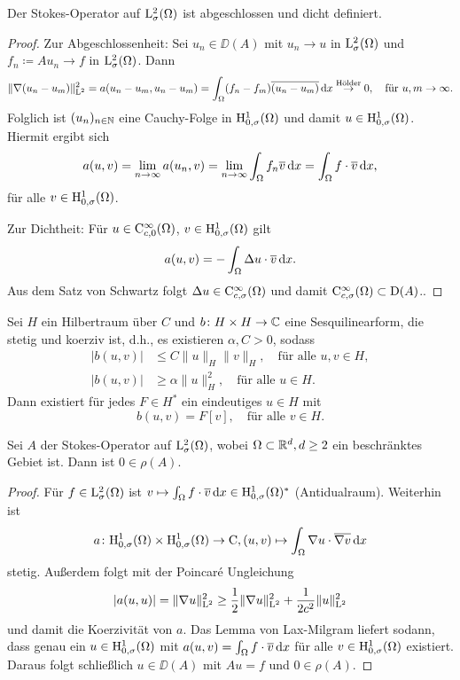 \begin{prop}
  Der Stokes-Operator auf $\mathrm{L}_\sigma^2(\Omega)$ ist abgeschlossen und dicht definiert.
\end{prop}

\begin{proof}
  Zur Abgeschlossenheit: Sei $u_n \in \DD(A)$ mit $u_n \to u$ in $\mathrm{L}^2_\sigma(\Omega)$ und $f_n \coloneqq A u_n \to f$ in $\mathrm{L}^2_\sigma(\Omega)$.
  Dann
  $$
  \|\nabla(u_n - u_m)\|_{\mathrm{L}^2}^2 
  = a(u_n - u_m, u_n - u_m)
  = \int_\Omega (f_n - f_m) \overline{(u_n - u_m)} \, {\operatorname{d}\!{x}}
  \overset{\text{Hölder}}{\to} 0, \quad\text{für } u,m \to \infty.
  $$
  Folglich ist $(u_n)_{n \in \mathbb{N}}$ eine Cauchy-Folge in $\mathrm{H}_{0,\sigma}^1(\Omega)$ und damit $u \in \mathrm{H}_{0,\sigma}^1(\Omega)$.
  Hiermit ergibt sich
  $$
  a(u,v) 
  = \lim_{n \to \infty} a(u_n,v)
  = \lim_{n \to \infty} \int_\Omega f_n \overline{v} \, {\operatorname{d}\!{x}}
  = \int_\Omega f \cdot \overline v \, {\operatorname{d}\!{x}},
  $$
 für alle $v \in \mathrm{H}_{0,\sigma}^1(\Omega)$.

 Zur Dichtheit: Für $u \in \mathrm{C}_{c,0}^\infty(\Omega)$, $v \in \mathrm{H}_{0,\sigma}^1(\Omega)$ gilt
 $$
 a(u,v) = -\int_\Omega \Delta u \cdot \overline v \, {\operatorname{d}\!{x}}.
 $$
 Aus dem Satz von Schwartz folgt $\Delta u \in \mathrm{C}_{c,\sigma}^\infty(\Omega)$ und damit $\mathrm{C}_{c,\sigma}^\infty(\Omega) \subset \mathrm{D}(A)$..
\end{proof}

\begin{lem*}
   Sei $H$ ein Hilbertraum über $C$ und $b \colon H \times H \to \mathbb{C}$ eine Sesquilinearform, die stetig und koerziv ist, d.h., es existieren $\alpha, C > 0$, sodass 
   \begin{align*}
     |b(u,v)| &\leq C \|u\|_H \|v\|_H, \quad \text{für alle }u,v \in H, \\
     |b(u,v)| &\geq \alpha \|u\|_H^2, \quad\text{für alle } u \in H.
   \end{align*}
   Dann existiert für jedes $F \in H^*$ ein eindeutiges $u \in H$ mit 
   $$
   b(u,v) = F[v], \quad\text{für alle } v \in H.
   $$
\end{lem*}

\begin{prop}
  Sei $A$ der Stokes-Operator auf $\mathrm{L}_\sigma^2(\Omega)$, wobei $\Omega \subset \mathbb{R}^d, d \geq 2$ ein beschränktes Gebiet ist.
  Dann ist $0 \in \rho(A)$.
\end{prop}

\begin{proof}
  Für $f \in \mathrm{L}_\sigma^2(\Omega)$ ist $v \mapsto \int_\Omega f \cdot \overline v \, {\operatorname{d}\!{x}} \in \mathrm{H}_{0,\sigma}^1(\Omega)^*$ (Antidualraum).
  Weiterhin ist $$a \colon \mathrm{H}_{0,\sigma}^1(\Omega) \times \mathrm{H}_{0,\sigma}^1(\Omega) \to \mathrm{C}, (u,v) \mapsto \int_\Omega \nabla u \cdot \overline{\nabla v} \, {\operatorname{d}\!{x}}$$ stetig.
  Außerdem folgt mit der Poincar\'e Ungleichung
  $$
  |a(u,u)| = \|\nabla u\|_{\mathrm{L}^2}^2 \geq \frac{1}{2} \|\nabla u\|_{\mathrm{L}^2}^2 + \frac{1}{2 c^2} \|u\|_{\mathrm{L}^2}^2
  $$
  und damit die Koerzivität von $a$.
  Das Lemma von Lax-Milgram liefert sodann, dass genau ein $u \in \mathrm{H}_{0,\sigma}^1(\Omega)$ mit $a(u,v) = \int_\Omega f \cdot \overline v \, {\operatorname{d}\!{x}}$ für alle $v \in \mathrm{H}_{0,\sigma}^1(\Omega)$ existiert.
  Daraus folgt schließlich $u \in \DD(A)$ mit $A u = f$ und $0 \in \rho(A)$.
\end{proof}

